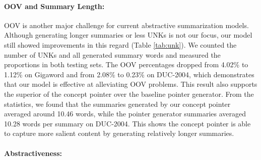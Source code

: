 \documentclass[11pt,a4paper]{article}
\begin{document}
 
\paragraph{OOV and Summary Length:}
\begin{table}[t]
    \centering
    \caption{OOV problem analysis: percentages (\%(NO. UNK/NO. all generated words)) of generating UNK w.r.t the following three models on Gigaword and DUC-2004 datasets.}
    \label{tab:humantest}
    \label{tab:unk}
\end{table}
 OOV is another major challenge for current abstractive summarization models. Although generating longer summaries or less UNKs is not our focus, our model still showed improvements in this regard (Table \ref{tab:unk}). We counted the number of UNKs and all generated summary words and measured the proportions in both testing sets. 
 The OOV percentages dropped  from 4.02\% to 1.12\% on Gigaword and from 2.08\% to 0.23\% on DUC-2004, which demonstrates that our model is effective at alleviating OOV problems. This result also supports the superior of the concept pointer over the baseline pointer generator. From the statistics, we found that the summaries generated by our concept pointer averaged around 10.46 words, while the pointer generator summaries averaged 10.28 words per summary on DUC-2004. This shows the concept pointer is able to capture more salient content by generating relatively longer summaries. 
 
\paragraph{Abstractiveness:}
 \begin{table}[t]
     \centering
     \caption{Abstractiveness: percentage of novel -grams on Gigaword dataset.}
     \label{tab:abstraction}
     \label{tab:abstract}
 \end{table}
 
\end{document}
